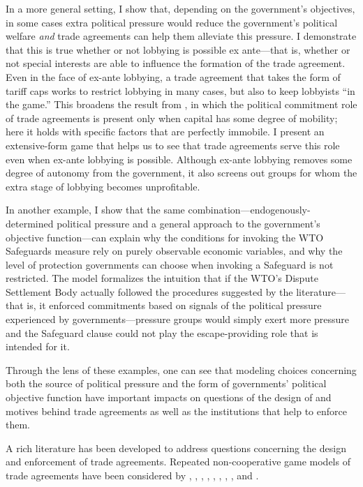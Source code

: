 In a more general setting, I show that, depending on the government's objectives, in some cases extra political pressure would reduce the government's political welfare \textit{and} trade agreements can help them alleviate this pressure. I demonstrate that this is true whether or not lobbying is possible ex ante---that is, whether or not special interests are able to influence the formation of the trade agreement. Even in the face of ex-ante lobbying, a trade agreement that takes the form of tariff caps works to restrict lobbying in many cases, but also to keep lobbyists ``in the game.'' This broadens the result from \Textcite{mrc2007}, in which the political commitment role of trade agreements is present only when capital has some degree of mobility; here it holds with specific factors that are perfectly immobile. I present an extensive-form game that helps us to see that trade agreements serve this role even when ex-ante lobbying is possible. Although ex-ante lobbying removes some degree of autonomy from the government, it also screens out groups for whom the extra stage of lobbying becomes unprofitable.

In another example, I show that the same combination---endogenously-determined political pressure and a general approach to the government's objective function---can explain why the conditions for invoking the WTO Safeguards measure rely on purely observable economic variables, and why the level of protection governments can choose when invoking a Safeguard is not restricted. The model formalizes the intuition that if the WTO's Dispute Settlement Body actually followed the procedures suggested by the literature---that is, it enforced commitments based on signals of the political pressure experienced by governments---pressure groups would simply exert more pressure and the Safeguard clause could not play the escape-providing role that is intended for it.

Through the lens of these examples, one can see that modeling choices concerning both the source of political pressure and the form of governments' political objective function have important impacts on questions of the design of and motives behind trade agreements as well as the institutions that help to enforce them.

A rich literature has been developed to address questions concerning the design and enforcement of trade agreements. Repeated non-cooperative game models of trade agreements have been considered by \Textcite{mcm86,mcm89}, \Textcite{dixit1987}, \Textcite{bs1990, bs1997a, bs1997b, bs2002}, \Textcite{kovthurs}, \Textcite{maggi99}, \Textcite{ederington}, \Textcite{rosendorff}, \Textcite{bagwell2009}, and \Textcite{park}.

